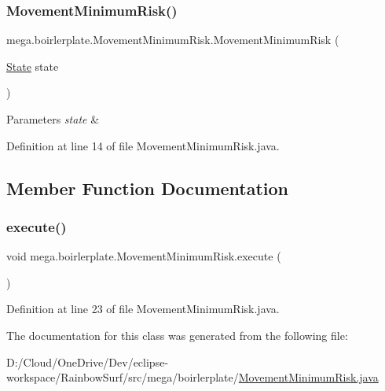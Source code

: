 \subsubsection{\texorpdfstring{Movement\+Minimum\+Risk()}{MovementMinimumRisk()}}
{\footnotesize\ttfamily mega.\+boirlerplate.\+Movement\+Minimum\+Risk.\+Movement\+Minimum\+Risk (\begin{DoxyParamCaption}\item[{\hyperlink{classmega_1_1boirlerplate_1_1_state}{State}}]{state }\end{DoxyParamCaption})}


\begin{DoxyParams}{Parameters}
{\em state} & \\
\hline
\end{DoxyParams}


Definition at line 14 of file Movement\+Minimum\+Risk.\+java.



\subsection{Member Function Documentation}
\mbox{\label{classmega_1_1boirlerplate_1_1_movement_minimum_risk_ab501a9f3690d8ff73ed25fb05374c83f}} 
\subsubsection{\texorpdfstring{execute()}{execute()}}
{\footnotesize\ttfamily void mega.\+boirlerplate.\+Movement\+Minimum\+Risk.\+execute (\begin{DoxyParamCaption}{ }\end{DoxyParamCaption})}



Definition at line 23 of file Movement\+Minimum\+Risk.\+java.



The documentation for this class was generated from the following file\+:\begin{DoxyCompactItemize}
\item 
D\+:/\+Cloud/\+One\+Drive/\+Dev/eclipse-\/workspace/\+Rainbow\+Surf/src/mega/boirlerplate/\hyperlink{_movement_minimum_risk_8java}{Movement\+Minimum\+Risk.\+java}\end{DoxyCompactItemize}
